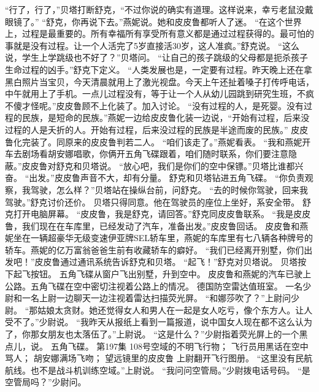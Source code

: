 \documentclass[a4paper,12pt,UTF8,twoside]{ctexbook}
\begin{document}
        “行了，行了，”贝塔打断舒克，“不过你说的确实有道理。这样说来，幸亏老鼠没戴眼镜了。” 
        “舒克，你再说下去。”燕妮说。她和皮皮鲁都听人了迷。 
        “在这个世界上，过程是最重要的。所有幸福所有享受所有意义都是通过过程获得的。最可怕的事就是没有过程。让一个人活完了5岁直接活30岁，这人准疯。”舒克说。 
        “这么说，学生上学跳级也不好了？”贝塔问。 
        “让自己的孩子跳级的父母都是扼杀孩子生命过程的凶手。”舒克下定义。 
        “人类发展也是，一定要有过程。昨天晚上还在拿黑白照片当宝贝，今天清晨就用上了激光视盘。今天上午还扯着嗓子打传呼电话，中午就用上了手机。一点儿过程没有，等于让一个人从幼儿园跳到研究生班，不疯不傻才怪呢。”皮皮鲁顾不上化装了。加入讨论。 
        “没有过程的人，是死婴。没有过程的民族，是短命的民族。”燕妮一边给皮皮鲁化装一边说，“开始有过程，后来没过程的人是夭折的人。开始有过程，后来没过程的民族是半途而废的民族。” 
        皮皮鲁化完装了。同原来的皮皮鲁判若二人。 
        “咱们该走了。”燕妮看表。 
        “我和燕妮开车去剧场看胡安娜唱歌，你俩开五角飞碟跟着，咱们随时联系，你们要注意隐蔽。”皮皮鲁对舒克和贝塔说。 
        “放心吧，我们是你们的空中保镖。”贝塔比谁都兴奋。 
        “出发。”皮皮鲁声音不大，却有分量。 
        舒克和贝塔钻进五角飞碟。 
        “你负责观察，我驾驶，怎么样？”贝塔站在操纵台前，问舒克。 
        “去的时候你驾驶，回来我驾驶。”舒克讨价还价。 
        贝塔只得同意。他在驾驶员的座位上坐好，系安全带。 
        舒克打开电脑屏幕。 
        “皮皮鲁，我是舒克，请回答。”舒克同皮皮鲁联系。 
        “我是皮皮鲁，我们现在在车库里，已经发动了汽车，准备出发。”皮皮鲁回话。 
        皮皮鲁和燕妮坐在一辆超豪华无级变速伊亚牌SEL轿车里，燕妮的车库里有七八辆各种牌号的轿车。燕妮的亿万富翁爸爸生前有收藏轿车的癖好。 
        “我们已经离开别墅，你们出发吧！”皮皮鲁通过通讯系统告诉舒克和贝塔。 
        “起飞！”舒克对贝塔说。 
        贝塔按下起飞按钮。 
        五角飞碟从窗户飞出别墅，升到空中。 
        皮皮鲁和燕妮的汽车已驶上公路。五角飞碟在空中密切注视着公路上的情况。 
        德国防空雷达值班室。 
        一名少尉和一名上尉一边聊天一边注视着雷达扫描荧光屏。 
        “和娜莎吹了？”上尉问少尉。 
        “那姑娘太贪财。她还觉得女人和男人在一起是女人吃亏，像个东方人。让人受不了。”少尉说。 
        “我昨天从报纸上看到一篇报道，说中国女人现在都不这么认为了，你那女朋友也太落伍了。”上尉说。 
        “这是什么？”少尉指着荧光屏上的一个黑点儿，说。 
        五角飞碟。   第197集 
        108号空域的不明飞行物； 
        飞行员用黑话在空中骂人； 
        胡安娜满场飞吻； 
        望远镜里的皮皮鲁   
        上尉翻开飞行图册。 
        “这里没有民航航线。也不是战斗机训练空域。”上尉说。 
        “我问问空管局。”少尉拨电话号码。 
        “是空管局吗？”少尉问。 
\end{document}
